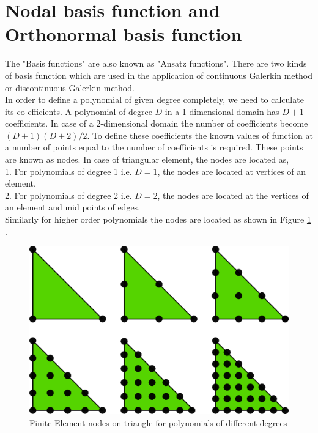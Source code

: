 \documentclass[a4paper]{book}
\begin{document}
\section[Basis function]{Nodal basis function and Orthonormal basis function}

The "Basis functions" are also known as "Ansatz functions". There are two kinds of basis function which are used in the application of continuous Galerkin method or discontinuous Galerkin method. \\
In order to define a polynomial of given degree completely, we need to calculate its co-efficients. A polynomial of degree $D$ in a 1-dimensional domain has $D+1$ coefficients. In case of a 2-dimensional domain the number of coefficients become $(D+1)(D+2)/2$. To define these coefficients the known values of function at a number of points equal to the number of coefficients is required. These points are known as nodes. In case of triangular element, the nodes are located as,\\
1. For polynomials of degree 1 i.e. $D=1$, the nodes are located at vertices of an element.\\
2. For polynomials of degree 2 i.e. $D=2$, the nodes are located at the vertices of an element and mid points of edges.\\
Similarly for higher order polynomials the nodes are located as shown in Figure \ref{fig:Nodes on Triangular Element} . 

\begin{figure} [H]
  \includegraphics[width=\linewidth]{fem_triangle_2.png}
  \caption{Finite Element nodes on triangle for polynomials of different degrees}
  \label{fig:Nodes on Triangular Element}
\end{figure}
\end{document}
